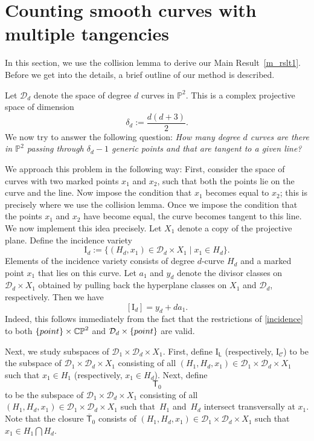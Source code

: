 \documentclass[11pt]{article}
\numberwithin{equation}{section}
\begin{document}
\section{Counting smooth curves with multiple tangencies}\label{smooth_tangencies}
\label{smooth_curves_enum}
In this section, we use the collision lemma to derive our Main Result~\ref{m_rslt1}.
Before we get into the details, a brief outline of our method is described.

Let $\mathcal{D}_d$
denote the space of degree $d$ curves in $\mathbb{P}^2$. This is a complex projective space of dimension
\begin{equation}\label{eb}
\delta_d :=  \frac{d(d+3)}{2}.
\end{equation}
We now try to answer the following question:
{\it How many degree $d$ curves are there in $\mathbb{P}^2$ passing through
$\delta_d-1$ generic points and that are tangent to a given line?}

We approach this problem in the following way: First, consider the space of curves with two marked points $x_1$ and $x_2$, such that
both the points lie on the curve and the line. Now
impose the condition that $x_1$ becomes equal to $x_2$; this is precisely where
we use the collision lemma.
Once we impose the condition that the points $x_1$ and $x_2$
have become equal,
the curve becomes tangent to this line.
We now implement this idea precisely.
Let $X_1$ denote a copy of the projective plane. Define
the incidence variety
\begin{equation}\label{f1}
\mathrm{I}_d := \{ (H_d, x_1) \in  \mathcal{D}_d \times X_1 \mid  x_1 \in H_d\}.
\end{equation}
Elements of the incidence variety consists of
degree $d$-curve $H_d$ and a marked point $x_1$ that lies on this curve.
Let $a_1$ and $y_d$ denote the divisor classes on $\mathcal{D}_d \times X_1$ obtained by pulling back the
hyperplane classes on $X_1$ and $\mathcal{D}_d$, respectively. Then we have
\begin{equation}\label{incidence}
[\mathrm{I}_d]  =  y_d + d a_1.
\end{equation}
Indeed, this follows immediately from the fact that the restrictions of \eqref{incidence} to both
$\{{\rm point}\}\times \mathbb{CP}^2$ and $\mathcal{D}_d \times \{{\rm point}\}$ are valid.

Next, we study subspaces of $\mathcal{D}_1 \times \mathcal{D}_d \times X_1$.
First, define
$\mathrm{I}_{\mathsf{L}}$ (respectively, $\mathrm{I}_{\mathcal{C}}$)
to be the subspace of $\mathcal{D}_1 \times \mathcal{D}_d \times X_1$ consisting of all
$(H_1, H_d, x_1)  \in \mathcal{D}_1 \times \mathcal{D}_d \times X_1$
such that $x_1 \in H_1$ (respectively, $x_1 \in H_d$).
Next, define
\begin{equation}
\label{et}
\mathsf{T}_0
\end{equation}
to be the subspace
of $\mathcal{D}_1 \times \mathcal{D}_d \times X_1$ consisting of all
$(H_1, H_d, x_1)  \in \mathcal{D}_1 \times \mathcal{D}_d \times X_1$ such that~$H_1$ and~$H_d$ intersect transversally at $x_1$.
Note that the closure $\overline{\mathsf{T}}_0$ consists of
$(H_1, H_d, x_1)  \in \mathcal{D}_1 \times \mathcal{D}_d \times X_1$
such that $x_1 \in H_1\bigcap H_d$.
\end{document}
